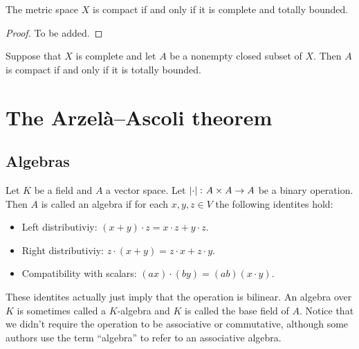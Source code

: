 \documentclass[11pt,a4paper]{article}
\begin{document}
\begin{proposition}
  The metric space $X$ is compact if and only if it is complete
  and totally bounded.
\end{proposition}
\begin{proof}
  To be added.
\end{proof}

\begin{corollary}
  Suppose that $X$ is complete and let $A$ be a nonempty closed subset
  of $X$. Then $A$ is compact if and only if it is totally bounded.
\end{corollary}

\newpage

\section{The Arzelà--Ascoli theorem}\label{sec:the-AA-theorem}

\subsection{Algebras}

\begin{definition}[Algebra]
  Let $K$ be a field and $A$ a vector 
  space. Let $\left\lvert\cdot\right\rvert \colon A \times A \to A$ be a binary operation.
  Then $A$ is called an algebra if for each $x,y,z \in V$ 
  the following identites hold:
  \begin{itemize}
    \item Left distributiviy: $(x + y) \cdot z = x \cdot z + y \cdot z$.
    \item Right distributiviy: $z \cdot (x + y) = z \cdot x + z \cdot y$.
    \item Compatibility with scalars: 
    $(ax) \cdot (by) = (ab) (x \cdot y)$.
  \end{itemize}
\end{definition}

\begin{remark}
  These identites actually just imply that the operation is bilinear.
  An algebra over $K$ is sometimes called a $K$-algebra and $K$ is
  called the base field of $A$. Notice that we didn't require the operation
  to be associative or commutative, although some authors use the term
  ``algebra'' to refer to an associative algebra.
\end{remark}
\end{document}
